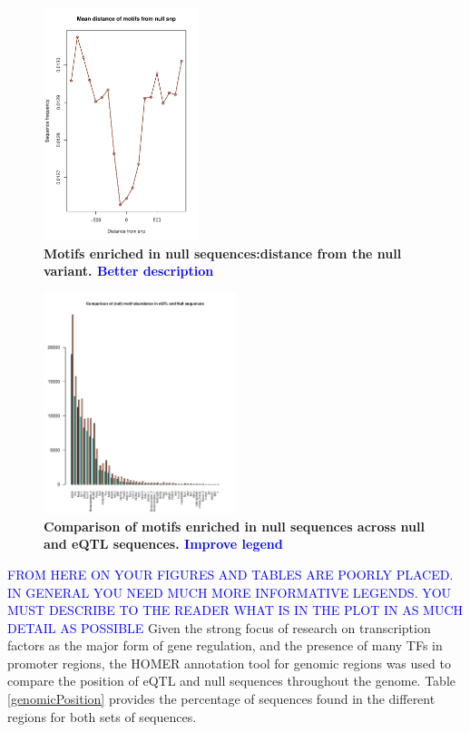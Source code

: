 \documentclass[12pt]{article}
\begin{document}
\begin{figure}[!htbp]
\centering
\includegraphics[width= 0.4\textwidth]{NullMotifsPlot.pdf} 
\caption{\bf{Motifs enriched in null sequences:distance from the null variant.} \textcolor{blue}{Better description}}
\label{nullDistance}
\end{figure}

\begin{figure}[!htbp]
\centering
\includegraphics[width= 0.5\textwidth]{nullMotifsComparison.pdf} 
\caption{\bf{Comparison of motifs enriched in null sequences across null and eQTL sequences.} \textcolor{blue}{Improve legend}}
\label{nullMotifComparison}
\end{figure}

\newpage
\textcolor{blue}{FROM HERE ON YOUR FIGURES AND TABLES ARE POORLY PLACED. IN GENERAL YOU NEED MUCH MORE INFORMATIVE
LEGENDS. YOU MUST DESCRIBE TO THE READER WHAT IS IN THE PLOT IN AS MUCH DETAIL AS POSSIBLE}
Given the strong focus of research on transcription factors as the major form of gene regulation, and the presence of many TFs in promoter regions, the HOMER annotation tool for genomic regions was used to compare the position of eQTL and null sequences throughout the genome. Table \ref{genomicPosition} provides the percentage of sequences found in the different regions for both sets of sequences.
\end{document}
